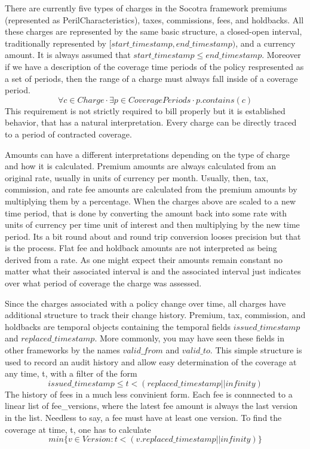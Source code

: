 There are currently five types of charges in the Socotra framework premiums (represented as PerilCharacteristics), taxes,
commissions, fees, and holdbacks. All these charges are represented by the same basic structure, a closed-open
interval, traditionally represented by $[start\_timestamp, end\_timestamp)$, and a currency amount. It is
always assumed that $start\_timestamp \leq end\_timestamp$. Moreover if we have a description of the
coverage time periods of the policy respresented as a set of periods, then the range of a charge must always
fall inside of a coverage period.
\begin{equation*}
\forall c \in Charge \cdot \exists p \in CoveragePeriods \cdot p.contains(c)
\end{equation*}
This requirement is not strictly required to bill properly but it is established behavior, that has a natural
interpretation. Every charge can be directly traced to a period of contracted coverage.

Amounts can have a different interpretations depending on the type of charge and how it is calculated.
Premium amounts are always calculated from an original rate, usually in units of currency per month. Usually, then,
tax, commission, and rate fee amounts are calculated from the premium amounts by multiplying them by a percentage.
When the charges above are scaled to a new time period, that is done by converting the amount back into
some rate with units of currency per time unit of interest and then multiplying by the new time period. Its a bit
round about and round trip conversion looses precision but that is the process. Flat fee and holdback amounts are
not interpreted as being derived from a rate. As one might expect their amounts remain constant no
matter what their associated interval is and the associated interval just indicates over what period of coverage the
charge was assessed.

Since the charges associated with a policy change over time, all charges have additional structure to track their
change history. Premium, tax, commission, and holdbacks are temporal objects containing the temporal fields $issued\_timestamp$ and $replaced\_timestamp$.
More commonly, you may have seen these fields in other frameworks by the names $valid\_from$ and
$valid\_to$. This simple structure is used to record an audit history and allow easy determination of the
coverage at any time, t, with a filter of the form
\begin{equation*}
issued\_timestamp \leq t < (replaced\_timestamp || infinity)
\end{equation*}
The history of fees in a much less convinient form. Each fee is connnected to a linear list of fee\_versions, where
the latest fee amount is always the last version in the list. Needless to say, a fee must have at least one version.
To find the coverage at time, t, one has to calculate
\begin{equation*}
min \lbrace v \in Version : t < (v.replaced\_timestamp || infinity) \rbrace
\end{equation*}

